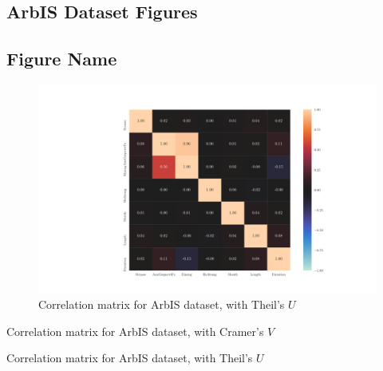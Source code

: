 \documentclass[a4paper,12pt]{report}
\newcommand{\nocontentsline}[3]{}
\newcommand{\tocless}[2]{\bgroup\let\addcontentsline=\nocontentsline#1{#2}\egroup}
\begin{document}
\begin{appendices}
\chapter{ArbIS Dataset Figures}
\tocless\section{Figure Name}
\label{appendix_TODO}

\label{appendix_baysis_dataset_corr_theils}
\begin{figure}[h]
	\centering
	\includegraphics[scale=0.8]{../CorrAnalysis/data/ArbIS/01_dataset/plots/arbis_dataset_corr_theils}
	\caption{Correlation matrix for ArbIS dataset, with Theil's $U$}
	\label{img:appendix_correlation_matrix_dataset_theils}
\end{figure}
\restoregeometry

\begin{table}
\setlength{\tabcolsep}{4pt}
\centering

\caption{Correlation matrix for ArbIS dataset, with Cramer's $V$}
\end{table} %

\begin{table}
\setlength{\tabcolsep}{4pt}
\centering

\caption{Correlation matrix for ArbIS dataset, with Theil's $U$}
\end{table} %


\end{appendices}
\end{document}
